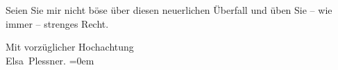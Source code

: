 \pstart
           Seien Sie mir nicht böse über diesen neuerlichen Überfall und üben Sie – wie immer –
               strenges Recht.\pend
           
\pstart
           Mit vorzüglicher Hochachtung{\\[\baselineskip]}\spacefill\mbox{Elsa Plessner.}\pend
           \leftskip=0em{}\endnumbering{}  \newcommand{\dateiname}{L03723}\newcommand{\titel}{Elsa Plessner an Arthur Schnitzler, 9. 1. 1900}\newcommand{\editorInnen}{Selma Jahnke und Martin Anton Müller}
